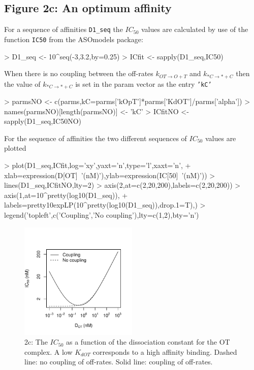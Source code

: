 \documentclass{article}
\newenvironment{Ncenter}{%
  \setlength\topsep{-10pt}
  \setlength\parskip{-100pt}
  \begin{center}
}{%
  \end{center}
}
\newcommand{\kmo}{k_{OT \to O+T}}
\newcommand{\kD}{k_{*C \to *+C}}
\begin{document}
\subsection*{Figure 2c: An optimum affinity}
For a sequence of affinities \texttt{D1\_seq} the $IC_{50}$ values are calculated by use of the function \texttt{IC50} from the ASOmodels package:
\begin{Schunk}
\begin{Sinput}
> D1_seq <- 10^seq(-3,3.2,by=0.25)
> ICfit <- sapply(D1_seq,IC50)
\end{Sinput}
\end{Schunk}
When there is no coupling between the off-rates $\kmo$ and $\kD$ then the value of $\kD$ is set in the param vector as the entry \texttt{'kC'}
\begin{Schunk}
\begin{Sinput}
> parmsNO <- c(parms,kC=parms['kOpT']*parms['KdOT']/parms['alpha'])
> names(parmsNO)[length(parmsNO)] <- 'kC'
> ICfitNO <- sapply(D1_seq,IC50NO)
\end{Sinput}
\end{Schunk}
For the sequence of affinities the two different sequences of $IC_{50}$ values are plotted
\begin{Schunk}
\begin{Sinput}
> plot(D1_seq,ICfit,log='xy',yaxt='n',type='l',xaxt='n',
+      xlab=expression(D[OT]~'(nM)'),ylab=expression(IC[50]~'(nM)'))
> lines(D1_seq,ICfitNO,lty=2)
> axis(2,at=c(2,20,200),labels=c(2,20,200))
> axis(1,at=10^pretty(log10(D1_seq)),
+      labels=pretty10expLP(10^pretty(log10(D1_seq)),drop.1=T),)
> legend('topleft',c('Coupling','No coupling'),lty=c(1,2),bty='n')
\end{Sinput}
\end{Schunk}
\begin{figure}[!h]
\begin{Ncenter}
\includegraphics[width=0.5\textwidth]{Vignette2-Fig3}
\end{Ncenter}
\caption{2c: The $IC_{50}$ as a function of the dissociation constant for the OT complex. A low $K_{dOT}$ corresponds to a high affinity binding. Dashed line: no coupling of off-rates. Solid line: coupling of off-rates.}
\end{figure}
\end{document}
